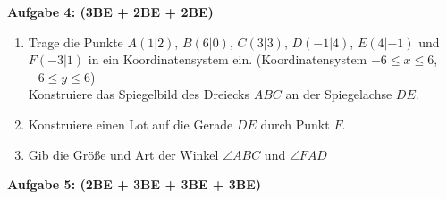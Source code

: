 \documentclass[a4paper,12pt]{article}
\newcommand{\Aufgabe}[1]{
  {
  \vspace*{0.5cm}
  \textsf{\textbf{Aufgabe #1}}
  \vspace*{0.2cm}
  
  }
}
\begin{document}
\newpage
\vspace*{-2cm}
\Aufgabe{4: (3BE + 2BE + 2BE)}
\begin{enumerate}[label={\alph*)}]
  \item Trage die Punkte $A(1|2)$, $B(6|0)$, $C(3|3)$, $D(-1|4)$, $E(4|-1)$ und $F(-3|1)$ in ein Koordinatensystem ein. (Koordinatensystem $-6\le x \le 6$, $-6\le y \le 6$)\\ 
    Konstruiere das Spiegelbild des Dreiecks $ABC$ an der Spiegelachse $DE$. 
  \item Konstruiere einen Lot auf die Gerade $DE$ durch Punkt $F$.
\vspace{190mm}
  \item Gib die Größe und Art der Winkel $\angle ABC$ und $\angle FAD$
\vspace{50mm}
\end{enumerate}

\newpage
\vspace*{-2cm}

\Aufgabe{5: (2BE + 3BE + 3BE + 3BE)}
\end{document}
